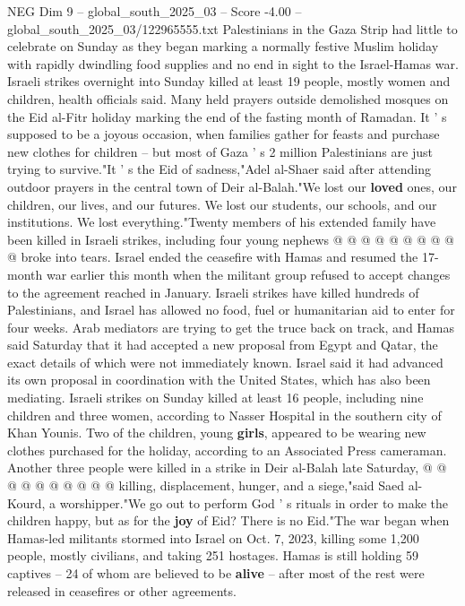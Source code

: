 \begin{textsample}{NEG Dim 9 – global\_south\_2025\_03 – Score -4.00 – global\_south\_2025\_03/122965555.txt}  \label{ex:f9_neg_396}
Palestinians in the Gaza Strip had little to celebrate on Sunday as they began marking a normally festive Muslim holiday with rapidly dwindling food supplies and no end in sight to the Israel-Hamas war.
Israeli strikes overnight into Sunday killed at least 19 people, mostly women and children, health officials said.
Many held prayers outside demolished mosques on the Eid al-Fitr holiday marking the end of the fasting month of Ramadan.
It ' s supposed to be a joyous occasion, when families gather for feasts and purchase new clothes for children -- but most of Gaza ' s 2 million Palestinians are just trying to survive."It ' s the Eid of sadness,"Adel al-Shaer said after attending outdoor prayers in the central town of Deir al-Balah."We lost our \textbf{loved} ones, our children, our lives, and our futures.
We lost our students, our schools, and our institutions.
We lost everything."Twenty members of his extended family have been killed in Israeli strikes, including four young nephews @ @ @ @ @ @ @ @ @ @ broke into tears.
Israel ended the ceasefire with Hamas and resumed the 17-month war earlier this month when the militant group refused to accept changes to the agreement reached in January.
Israeli strikes have killed hundreds of Palestinians, and Israel has allowed no food, fuel or humanitarian aid to enter for four weeks.
Arab mediators are trying to get the truce back on track, and Hamas said Saturday that it had accepted a new proposal from Egypt and Qatar, the exact details of which were not immediately known.
Israel said it had advanced its own proposal in coordination with the United States, which has also been mediating.
Israeli strikes on Sunday killed at least 16 people, including nine children and three women, according to Nasser Hospital in the southern city of Khan Younis.
Two of the children, young \textbf{girls}, appeared to be wearing new clothes purchased for the holiday, according to an Associated Press cameraman.
Another three people were killed in a strike in Deir al-Balah late Saturday, @ @ @ @ @ @ @ @ @ @ killing, displacement, hunger, and a siege,"said Saed al-Kourd, a worshipper."We go out to perform God ' s rituals in order to make the children happy, but as for the \textbf{joy} of Eid?
There is no Eid."The war began when Hamas-led militants stormed into Israel on Oct. 7, 2023, killing some 1,200 people, mostly civilians, and taking 251 hostages.
Hamas is still holding 59 captives -- 24 of whom are believed to be \textbf{alive} -- after most of the rest were released in ceasefires or other agreements.

\end{textsample}
